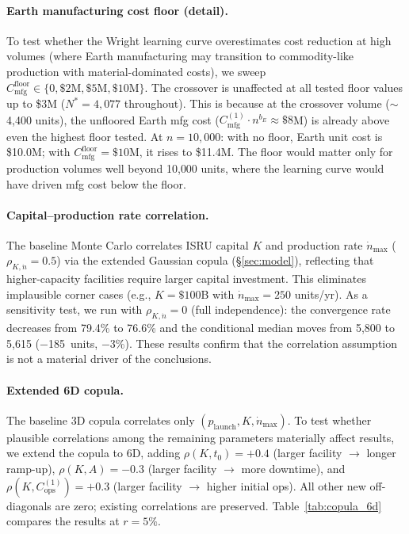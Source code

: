 \documentclass[5p,twocolumn]{elsarticle}
\begin{document}
\paragraph{Earth manufacturing cost floor (detail).} To test whether the Wright learning curve overestimates cost reduction at high volumes (where Earth manufacturing may transition to commodity-like production with material-dominated costs), we sweep $C_{\mathrm{mfg}}^{\mathrm{floor}} \in \{0, \$2\text{M}, \$5\text{M}, \$10\text{M}\}$. The crossover is unaffected at all tested floor values up to \$3M ($N^* = 4{,}077$ throughout). This is because at the crossover volume ($\sim$4{,}400 units), the unfloored Earth mfg cost ($C_{\mathrm{mfg}}^{(1)} \cdot n^{b_E} \approx \$8$M) is already above even the highest floor tested. At $n = 10{,}000$: with no floor, Earth unit cost is \$10.0M; with $C_{\mathrm{mfg}}^{\mathrm{floor}} = \$10$M, it rises to \$11.4M. The floor would matter only for production volumes well beyond 10{,}000 units, where the learning curve would have driven mfg cost below the floor.

\paragraph{Capital--production rate correlation.} The baseline Monte Carlo correlates ISRU capital $K$ and production rate $\dot{n}_{\max}$ ($\rho_{K,\dot{n}} = 0.5$) via the extended Gaussian copula (\S\ref{sec:model}), reflecting that higher-capacity facilities require larger capital investment. This eliminates implausible corner cases (e.g., $K = \$100$B with $\dot{n}_{\max} = 250$ units/yr). As a sensitivity test, we run with $\rho_{K,\dot{n}} = 0$ (full independence): the convergence rate decreases from 79.4\% to 76.6\% and the conditional median moves from 5{,}800 to 5{,}615 ($-$185~units, $-$3\%). These results confirm that the correlation assumption is not a material driver of the conclusions.

\paragraph{Extended 6D copula.} The baseline 3D copula correlates only $(p_{\mathrm{launch}}, K, \dot{n}_{\max})$. To test whether plausible correlations among the remaining parameters materially affect results, we extend the copula to 6D, adding $\rho(K, t_0) = +0.4$ (larger facility $\to$ longer ramp-up), $\rho(K, A) = -0.3$ (larger facility $\to$ more downtime), and $\rho(K, C_{\mathrm{ops}}^{(1)}) = +0.3$ (larger facility $\to$ higher initial ops). All other new off-diagonals are zero; existing correlations are preserved. Table~\ref{tab:copula_6d} compares the results at $r = 5\%$.
\end{document}
